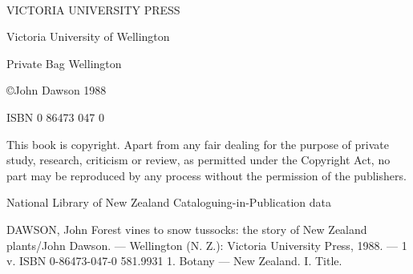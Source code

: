 \thispagestyle{empty}

~\vfill

VICTORIA UNIVERSITY PRESS

Victoria University of Wellington

Private Bag Wellington

©John Dawson 1988

ISBN 0 86473 047 0


This book is copyright. Apart from any fair dealing for the purpose of private study, research, criticism or review, as permitted under the Copyright Act, no part may be reproduced by any process without the permission of the publishers.

National Library of New Zealand
Cataloguing-in-Publication data

DAWSON, John
Forest vines to snow tussocks: the story of New Zealand plants/John Dawson. --- Wellington
(N. Z.): Victoria University Press, 1988. --- 1 v.
ISBN 0-86473-047-0%
581.9931
1. Botany --- New Zealand. I. Title.
